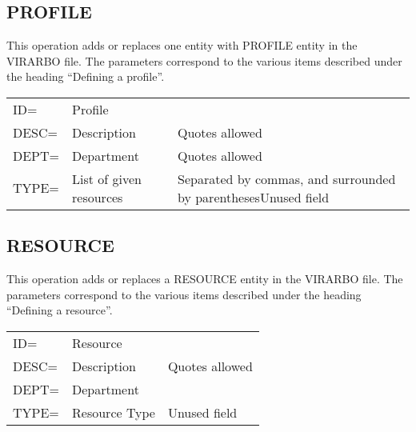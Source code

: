 \documentclass[letterpaper,10pt,english]{sphinxmanual}
\begin{document}

\subsection{PROFILE}
\label{\detokenize{Installation_Guide:profile}}\label{\detokenize{Installation_Guide:index-34}}
This operation adds or replaces one entity with PROFILE entity in the VIRARBO file. The parameters correspond to the various items described under the heading “Defining a profile”.


\begin{savenotes}\sphinxattablestart
\centering
\begin{tabulary}{\linewidth}[t]{|T|T|T|}
\hline
{}\relax &\relax &\relax \\
\hline
ID=
&
Profile
&\\
\hline
DESC=
&
Description
&
Quotes allowed
\\
\hline
DEPT=
&
Department
&
Quotes allowed
\\
\hline
TYPE=
&
List of given resources
&
Separated by commas, and surrounded by parenthesesUnused field
\\
\hline
\end{tabulary}
\par
\sphinxattableend\end{savenotes}


\subsection{RESOURCE}
\label{\detokenize{Installation_Guide:resource}}\label{\detokenize{Installation_Guide:index-35}}
This operation adds or replaces a RESOURCE entity in the VIRARBO file. The parameters correspond to the various items described under the heading “Defining a resource”.


\begin{savenotes}\sphinxattablestart
\centering
\begin{tabulary}{\linewidth}[t]{|T|T|T|}
\hline
{}\relax &\relax &\relax \\
\hline
ID=
&
Resource
&\\
\hline
DESC=
&
Description
&
Quotes allowed
\\
\hline
DEPT=
&
Department
&\\
\hline
TYPE=
&
Resource Type
&
Unused field
\\
\hline
\end{tabulary}
\par
\sphinxattableend\end{savenotes}
\end{document}
